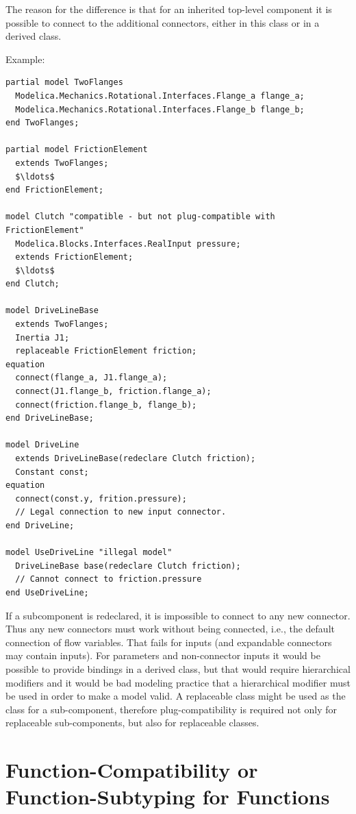 \begin{nonnormative}
The reason for the difference is that for an inherited top-level component it is possible to connect to the additional connectors, either in this class or in a derived class.

Example:
\begin{lstlisting}[language=modelica]
partial model TwoFlanges
  Modelica.Mechanics.Rotational.Interfaces.Flange_a flange_a;
  Modelica.Mechanics.Rotational.Interfaces.Flange_b flange_b;
end TwoFlanges;

partial model FrictionElement
  extends TwoFlanges;
  $\ldots$
end FrictionElement;

model Clutch "compatible - but not plug-compatible with FrictionElement"
  Modelica.Blocks.Interfaces.RealInput pressure;
  extends FrictionElement;
  $\ldots$
end Clutch;

model DriveLineBase
  extends TwoFlanges;
  Inertia J1;
  replaceable FrictionElement friction;
equation
  connect(flange_a, J1.flange_a);
  connect(J1.flange_b, friction.flange_a);
  connect(friction.flange_b, flange_b);
end DriveLineBase;

model DriveLine
  extends DriveLineBase(redeclare Clutch friction);
  Constant const;
equation
  connect(const.y, frition.pressure);
  // Legal connection to new input connector.
end DriveLine;

model UseDriveLine "illegal model"
  DriveLineBase base(redeclare Clutch friction);
  // Cannot connect to friction.pressure
end UseDriveLine;
\end{lstlisting}

If a subcomponent is redeclared, it is impossible to connect to any new connector.
Thus any new connectors must work without being connected, i.e., the default connection of flow variables.
That fails for inputs (and expandable connectors may contain inputs).
For parameters and non-connector inputs it would be possible to provide bindings in a derived class, but that would require hierarchical modifiers and it would be bad modeling practice that a hierarchical modifier must be used in order to make a model valid.
A replaceable class might be used as the class for a sub-component, therefore plug-compatibility is required not only for replaceable sub-components, but also for replaceable classes.
\end{nonnormative}

\section{Function-Compatibility or Function-Subtyping for Functions}\label{function-compatibility-or-function-subtyping-for-functions}

